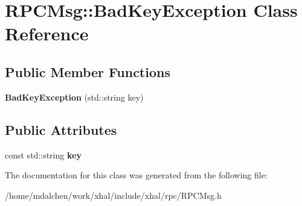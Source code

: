 \hypertarget{classRPCMsg_1_1BadKeyException}{
\section{RPCMsg::BadKeyException Class Reference}
\label{classRPCMsg_1_1BadKeyException}
}
\subsection*{Public Member Functions}
\begin{DoxyCompactItemize}
\item 
\hypertarget{classRPCMsg_1_1BadKeyException_a8f398ce142875dbab1303e765f5573e5}{
{\bfseries BadKeyException} (std::string key)}
\label{classRPCMsg_1_1BadKeyException_a8f398ce142875dbab1303e765f5573e5}

\end{DoxyCompactItemize}
\subsection*{Public Attributes}
\begin{DoxyCompactItemize}
\item 
\hypertarget{classRPCMsg_1_1BadKeyException_a32fea008d2f26201a0ca4c96c5413479}{
const std::string {\bfseries key}}
\label{classRPCMsg_1_1BadKeyException_a32fea008d2f26201a0ca4c96c5413479}

\end{DoxyCompactItemize}


The documentation for this class was generated from the following file:\begin{DoxyCompactItemize}
\item 
/home/mdalchen/work/xhal/include/xhal/rpc/RPCMsg.h\end{DoxyCompactItemize}
